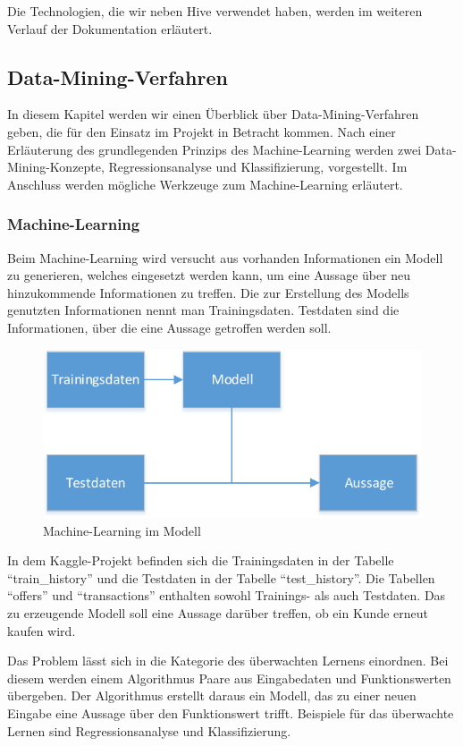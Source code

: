Die Technologien, die wir neben Hive verwendet haben, werden im weiteren Verlauf der Dokumentation erläutert.


\subsection{Data-Mining-Verfahren}
In diesem Kapitel werden wir einen Überblick über Data-Mining-Verfahren geben, die für den Einsatz im Projekt in Betracht kommen. Nach einer Erläuterung des grundlegenden Prinzips des Machine-Learning werden zwei Data-Mining-Konzepte, Regressionsanalyse und Klassifizierung, vorgestellt. Im Anschluss werden mögliche Werkzeuge zum Machine-Learning erläutert.

\subsubsection{Machine-Learning}
\label{subsubSec:MachineLearning}
Beim Machine-Learning wird versucht aus vorhanden Informationen ein Modell zu generieren, welches eingesetzt werden kann, um eine Aussage über neu hinzukommende Informationen zu treffen. Die zur Erstellung des Modells genutzten Informationen nennt man Trainingsdaten. Testdaten sind die Informationen, über die eine Aussage getroffen werden soll.

\begin{figure}[H]
\centering
\includegraphics[width=0.7\linewidth]{Bilder/DataMining}
\caption{Machine-Learning im Modell}
\label{fig:MachineLearning}
\end{figure}

In dem Kaggle-Projekt befinden sich die Trainingsdaten in der Tabelle "`train\_history"' und die Testdaten in der Tabelle "`test\_history"'. Die Tabellen "`offers"' und "`transactions"' enthalten sowohl Trainings- als auch Testdaten. Das zu erzeugende Modell soll eine Aussage darüber treffen, ob ein Kunde erneut kaufen wird.

Das Problem lässt sich in die Kategorie des überwachten Lernens einordnen. Bei diesem werden 
einem Algorithmus Paare aus Eingabedaten und Funktionswerten übergeben. Der Algorithmus erstellt
daraus ein Modell, das zu einer neuen Eingabe eine Aussage über den Funktionswert trifft. Beispiele für
das überwachte Lernen sind Regressionsanalyse und Klassifizierung.
 
